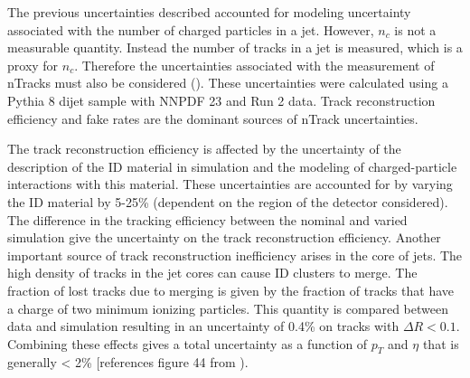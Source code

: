 The previous uncertainties described accounted for modeling uncertainty associated with the number of charged particles in a jet. However, $n_{c}$ is not a measurable quantity. Instead the number of tracks in a jet is measured, which is a proxy for $n_{c}$. Therefore the uncertainties associated with the measurement of nTracks must also be considered (\cite{JetFrag}). These uncertainties were calculated using a Pythia 8 dijet sample with NNPDF 23 and Run 2 data. Track reconstruction efficiency and fake rates are the dominant sources of nTrack uncertainties. 

The track reconstruction efficiency is affected by the uncertainty of the description of the ID material in simulation and the modeling of charged-particle interactions with this material. These uncertainties are accounted for by varying the ID material by 5-25\% (dependent on the region of the detector considered). The difference in the tracking efficiency between the nominal and varied simulation give the uncertainty on the track reconstruction efficiency. Another important source of track reconstruction inefficiency arises in the core of jets. The high density of tracks in the jet cores can cause ID clusters to merge. The fraction of lost tracks due to merging is given by the fraction of tracks that have a charge of two minimum ionizing particles. This quantity is compared between data and simulation resulting in an uncertainty of 0.4\% on tracks with $\Delta R < 0.1$. Combining these effects gives a total uncertainty as a function of $p_{T}$ and $\eta$ that is generally < 2\% [references figure 44 from \cite{JetFrag}). 

